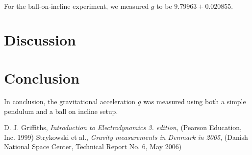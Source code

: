 \documentclass[a4paper,%
               aps,%
               prl,%
               amsfonts,%
               amssymb,%
               amsmath,%
               nobibnotes,%
               twocolumn, %
               twoside,%
               balancelastpage,%
               eqsecnum] %
               {revtex4-1}
\begin{document}
For the ball-on-incline experiment, we measured $g$ to be $9.79963+0.020855$.

\section{Discussion}




\section{Conclusion}

In conclusion, the gravitational acceleration $g$ was measured using both a simple pendulum and a ball on incline setup.


\begin{thebibliography}{99}  
 D. J. Griffiths, \emph{Introduction to Electrodynamics 3. edition}, (Pearson Education, Inc. 1999)        
 Strykowski et al., \emph{Gravity measurements in Denmark
in 2005}, (Danish National Space Center, Technical Report No. 6, May 2006)      
\end{thebibliography}
\end{document}
